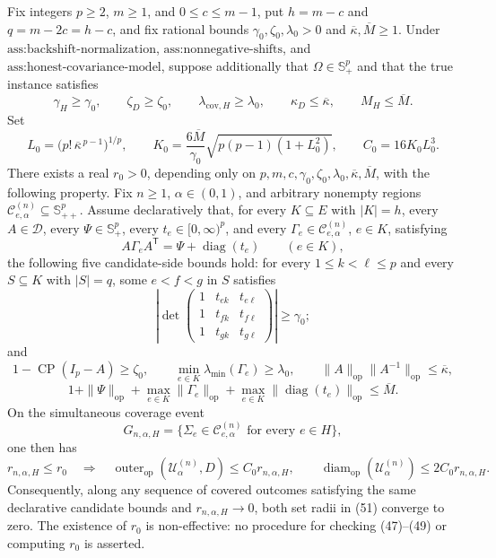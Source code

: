Fix integers \(p\geq2\), \(m\geq1\), and \(0\leq c\leq m-1\), put \(h=m-c\) and \(q=m-2c=h-c\), and fix rational bounds \(\gamma_0,\zeta_0,\lambda_0>0\) and \(\overline\kappa,\overline M\geq1\). Under \(\text{ass:backshift-normalization}\), \(\text{ass:nonnegative-shifts}\), and \(\text{ass:honest-covariance-model}\), suppose additionally that \(\Omega\in\mathbb S_+^p\) and that the true instance satisfies
\[
\gamma_H\geq\gamma_0,\qquad
\zeta_D\geq\zeta_0,\qquad
\lambda_{\mathrm{cov},H}\geq\lambda_0,\qquad
\kappa_D\leq\overline\kappa,\qquad
M_H\leq\overline M.
\tag{44}
\]
Set
\[
L_0=\bigl(p!\,\overline\kappa^{\,p-1}\bigr)^{1/p},\qquad
K_0=\frac{6\overline M}{\gamma_0}
\sqrt{p(p-1)(1+L_0^2)},
\qquad C_0=16K_0L_0^3.
\tag{45}
\]
There exists a real \(r_0>0\), depending only on \(p,m,c,\gamma_0,\zeta_0,\lambda_0,\overline\kappa,\overline M\), with the following property. Fix \(n\geq1\), \(\alpha\in(0,1)\), and arbitrary nonempty regions \(\mathcal C^{(n)}_{e,\alpha}\subseteq\mathbb S_{++}^p\). Assume declaratively that, for every \(K\subseteq E\) with \(|K|=h\), every \(A\in\mathcal D\), every \(\Psi\in\mathbb S_+^p\), every \(t_e\in[0,\infty)^p\), and every \(\Gamma_e\in\mathcal C^{(n)}_{e,\alpha}\), \(e\in K\), satisfying
\[
A\Gamma_eA^{\mathsf T}=\Psi+\operatorname{diag}(t_e)
\qquad(e\in K),
\tag{46}
\]
the following five candidate-side bounds hold: for every \(1\leq k<\ell\leq p\) and every \(S\subseteq K\) with \(|S|=q\), some \(e<f<g\) in \(S\) satisfies
\[
\left|\det\begin{pmatrix}
1&t_{ek}&t_{e\ell}\\
1&t_{fk}&t_{f\ell}\\
1&t_{gk}&t_{g\ell}
\end{pmatrix}\right|\geq\gamma_0;
\tag{47}
\]
and
\[
1-\operatorname{CP}(I_p-A)\geq\zeta_0,\qquad
\min_{e\in K}\lambda_{\min}(\Gamma_e)\geq\lambda_0,
\qquad
\|A\|_{\mathrm{op}}\|A^{-1}\|_{\mathrm{op}}\leq\overline\kappa,
\tag{48}
\]
\[
1+\|\Psi\|_{\mathrm{op}}
+\max_{e\in K}\|\Gamma_e\|_{\mathrm{op}}
+\max_{e\in K}\|\operatorname{diag}(t_e)\|_{\mathrm{op}}
\leq\overline M.
\tag{49}
\]
On the simultaneous coverage event
\[
G_{n,\alpha,H}=\{\Sigma_e\in\mathcal C^{(n)}_{e,\alpha}\text{ for every }e\in H\},
\tag{50}
\]
one then has
\[
r_{n,\alpha,H}\leq r_0
\quad\Longrightarrow\quad
\operatorname{outer}_{\mathrm{op}}(\mathcal U^{(n)}_\alpha,D)
\leq C_0r_{n,\alpha,H},
\qquad
\operatorname{diam}_{\mathrm{op}}(\mathcal U^{(n)}_\alpha)
\leq2C_0r_{n,\alpha,H}.
\tag{51}
\]
Consequently, along any sequence of covered outcomes satisfying the same declarative candidate bounds and \(r_{n,\alpha,H}\to0\), both set radii in (51) converge to zero. The existence of \(r_0\) is non-effective: no procedure for checking (47)--(49) or computing \(r_0\) is asserted.